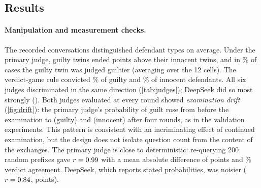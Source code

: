 \subsection{Results}

\paragraph{Manipulation and measurement checks.}
The recorded conversations distinguished defendant types on average. Under the primary judge,
guilty twins ended \TypeEffect{} points above their innocent twins, and in \PAUCOverall\% of cases the guilty twin
was judged guiltier (averaging over the 12 cells). The verdict-game rule convicted \ConvRateG\% of guilty and
\ConvRateI\% of innocent defendants. All six judges discriminated in the same direction (\cref{tab:judges}); DeepSeek
did so most strongly (\TypeEffectE{}). Both judges evaluated at every round showed \emph{examination drift}
(\cref{fig:drift}): the primary judge's probability of guilt rose from \DriftAGZero{} before the examination to
\DriftAGFour{} (guilty) and \DriftAIFour{} (innocent) after four rounds, as in the validation experiments. This pattern is consistent with an incriminating effect of
continued examination, but the design does not isolate question count from the content of the exchanges. The primary judge is
close to deterministic: re-querying 200 random prefixes gave $r=0.99$ with a mean absolute difference of
\RetestAMAD{} points and \RetestAVerdict\% verdict agreement. DeepSeek, which reports stated probabilities, was
noisier ($r=0.84$, \RetestEMAD{} points).

\begin{table}[t]
\centering\small
\caption{Confirmatory hypothesis tests (Study 1: H1--H6, outcome = primary judge's probability of guilt after
round 4, in points; Study 2: H7--H9, immediate outcome). Estimates are means of within-case contrasts over 48 cases;
$d_z$ is the mean divided by the SD of case-level contrasts; $p_{\text{Holm}}$ adjusts across all nine hypotheses.}
\label{tab:confirm}

\end{table}

